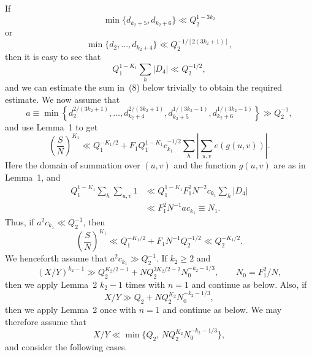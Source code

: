 \documentclass[10pt]{article}
\begin{document}
If
\[
  \min\{d_{k_2+5},d_{k_2+6}\}\ll Q_2^{1-3k_2}
\]
or
\[
  \min\{d_2,\ldots,d_{k_2+4}\}\ll Q_2^{-1/[2(3k_2+1)]},
\]
then it is easy to see that
\[
  Q_1^{1-K_1}\sum_h |D_4|\ll Q_2^{-1/2},
\]
and we can estimate the sum in~(8) below trivially to obtain the required estimate. We now assume that
\[
  a\equiv\min\left\{
    d_2^{2/(3k_2+1)},\ldots,d_{k_2+4}^{2/(3k_2+1)},
    d_{k_2+5}^{1/(3k_2-1)},d_{k_2+6}^{1/(3k_2-1)}
  \right\}\gg Q_2^{-1},
\]
and use Lemma~1 to get
\begin{equation}
  \left(\frac SN\right)^{K_1}
  \ll Q_1^{-K_1/2}
  +F_1Q_1^{1-K_1}c_{k_1}^{-1/2}
   \sum_h\left|\sum_{u,v}e(g(u,v))\right|.
  \tag{8}
\end{equation}
Here the domain of summation over $(u,v)$ and the function $g(u,v)$ are as in Lemma~1, and
\[
\begin{aligned}
  Q_1^{1-K_1}\sum_h\sum_{u,v}1
  &\ll Q_1^{1-K_1}F_1^2N^{-2}c_{k_1}\sum_h|D_4|\\
  &\ll F_1^2N^{-1}ac_{k_1}\equiv N_1.
\end{aligned}
\]
Thus, if $a^2c_{k_1}\ll Q_2^{-1}$, then
\[
  \left(\frac SN\right)^{K_1}
  \ll Q_1^{-K_1/2}+F_1N^{-1}Q_2^{-1/2}
  \ll Q_2^{-K_1/2}.
\]
We henceforth assume that $a^2c_{k_1}\gg Q_2^{-1}$. If $k_2\geqslant2$ and
\[
  (X/Y)^{k_2-1}
  \gg Q_2^{K_2/2-1}+NQ_2^{3K_2/2-2}N_0^{-k_2-1/3},
  \qquad N_0=F_1^2/N,
\]
then we apply Lemma~2 $k_2-1$ times with $n=1$ and continue as below. Also, if
\[
  X/Y\gg Q_2+NQ_2^{K_2}N_0^{-k_2-1/3},
\]
then we apply Lemma~2 once with $n=1$ and continue as below. We may therefore assume that
\[
  X/Y\ll\min\{Q_2,\,NQ_2^{K_2}N_0^{-k_2-1/3}\},
\]
and consider the following cases.
\end{document}
